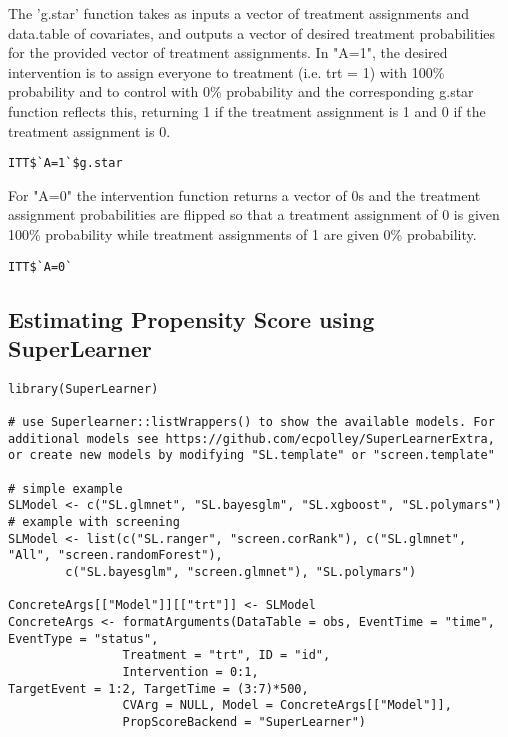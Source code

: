 \documentclass{report}
\newcommand{\1}{\ensuremath{\mathbf{1}}}
\begin{document}
The 'g.star' function takes as inputs a vector of treatment assignments and data.table of covariates, and outputs a vector of desired treatment probabilities for the provided vector of treatment assignments. In "A=1", the desired intervention is to assign everyone to treatment (i.e. trt = 1) with 100\% probability and to control with 0\% probability and the corresponding g.star function reflects this, returning 1 if the treatment assignment is 1 and 0 if the treatment assignment is 0.

\begin{lstlisting}
ITT$`A=1`$g.star
\end{lstlisting}

For "A=0" the intervention function returns a vector of 0s and the treatment assignment probabilities are flipped so that a treatment assignment of 0 is given 100\% probability while treatment assignments of 1 are given 0\% probability.

\begin{lstlisting}
ITT$`A=0`
\end{lstlisting}

\subsection{Estimating Propensity Score using SuperLearner}
\label{sec:org58da1f4}


\begin{lstlisting}
library(SuperLearner)

# use Superlearner::listWrappers() to show the available models. For additional models see https://github.com/ecpolley/SuperLearnerExtra, or create new models by modifying "SL.template" or "screen.template"

# simple example
SLModel <- c("SL.glmnet", "SL.bayesglm", "SL.xgboost", "SL.polymars")
# example with screening
SLModel <- list(c("SL.ranger", "screen.corRank"), c("SL.glmnet", "All", "screen.randomForest"), 
		c("SL.bayesglm", "screen.glmnet"), "SL.polymars")

ConcreteArgs[["Model"]][["trt"]] <- SLModel
ConcreteArgs <- formatArguments(DataTable = obs, EventTime = "time", EventType = "status", 
				Treatment = "trt", ID = "id", 
				Intervention = 0:1,
TargetEvent = 1:2, TargetTime = (3:7)*500, 
				CVArg = NULL, Model = ConcreteArgs[["Model"]], 
				PropScoreBackend = "SuperLearner")
\end{lstlisting}
\end{document}
